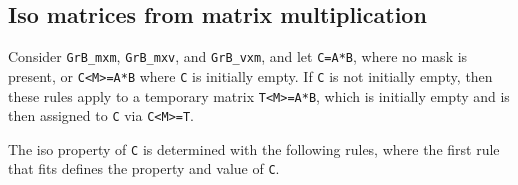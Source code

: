 \documentclass[12pt]{article}
\begin{document}
\subsection{Iso matrices from matrix multiplication}
\label{iso_mxm}

Consider \verb'GrB_mxm', \verb'GrB_mxv', and \verb'GrB_vxm', and
    let \verb'C=A*B', where no mask is present, or \verb'C<M>=A*B' where
    \verb'C' is initially empty.  If \verb'C' is not initially empty,
    then these rules apply to a temporary matrix \verb'T<M>=A*B', which is
    initially empty and is then assigned to \verb'C' via \verb'C<M>=T'.

    The iso property of \verb'C' is determined with the following rules,
    where the first rule that fits defines the property and value of \verb'C'.
\end{document}
